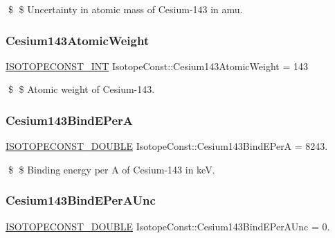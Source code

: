 \$ \$ Uncertainty in atomic mass of Cesium-\/143 in amu. \mbox{\label{group___isotope_const-_cesium-_cs143_ga3ebb16372d3cb30698ed1e18d8a92b48}} 
\subsubsection{\texorpdfstring{Cesium143\+Atomic\+Weight}{Cesium143AtomicWeight}}
{\footnotesize\ttfamily \mbox{\hyperlink{group___isotope_const-_macros_ga5f18360b3e99483a35c32d789e62621c}{I\+S\+O\+T\+O\+P\+E\+C\+O\+N\+S\+T\+\_\+\+I\+NT}} Isotope\+Const\+::\+Cesium143\+Atomic\+Weight = 143}

\$ \$ Atomic weight of Cesium-\/143. \mbox{\label{group___isotope_const-_cesium-_cs143_gab631c9b3d4d547b65e93ad1ad61347c2}} 
\subsubsection{\texorpdfstring{Cesium143\+Bind\+E\+PerA}{Cesium143BindEPerA}}
{\footnotesize\ttfamily \mbox{\hyperlink{group___isotope_const-_macros_ga8f45a7272ce02c0b4c65c44636ed719a}{I\+S\+O\+T\+O\+P\+E\+C\+O\+N\+S\+T\+\_\+\+D\+O\+U\+B\+LE}} Isotope\+Const\+::\+Cesium143\+Bind\+E\+PerA = 8243.}

\$ \$ Binding energy per A of Cesium-\/143 in keV. \mbox{\label{group___isotope_const-_cesium-_cs143_gaa026ba9915356dcff59d802601fadc64}} 
\subsubsection{\texorpdfstring{Cesium143\+Bind\+E\+Per\+A\+Unc}{Cesium143BindEPerAUnc}}
{\footnotesize\ttfamily \mbox{\hyperlink{group___isotope_const-_macros_ga8f45a7272ce02c0b4c65c44636ed719a}{I\+S\+O\+T\+O\+P\+E\+C\+O\+N\+S\+T\+\_\+\+D\+O\+U\+B\+LE}} Isotope\+Const\+::\+Cesium143\+Bind\+E\+Per\+A\+Unc = 0.}

